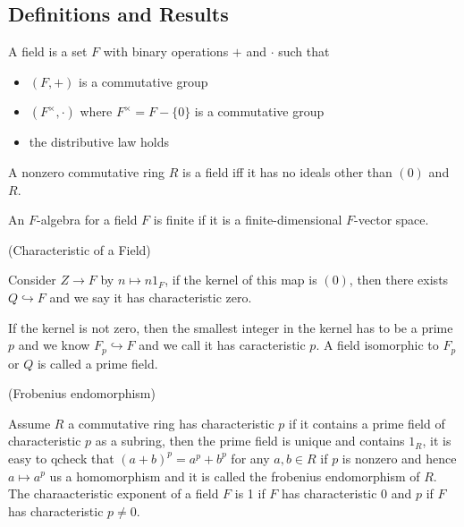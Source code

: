 \documentclass{article}
\begin{document}
\subsection{Definitions and Results}

\begin{definition}
    A field is a set $F$ with binary operations $+$ and $\cdot$ such that
    \begin{itemize}
        \item $(F,+)$ is a commutative group
        \item $(F^{\times},\cdot)$ where $F^{\times} = F - \{0\}$ is a commutative group
        \item the distributive law holds
    \end{itemize}
\end{definition}

\begin{lemma}
    A nonzero commutative ring $R$ is a field iff it has no ideals other than $(0)$ and $R$.
\end{lemma}

\begin{definition}
    An $F$-algebra for a field $F$ is finite if it is a finite-dimensional $F$-vector space.
\end{definition}

\begin{definition}
    (Characteristic of a Field)\par
    Consider $Z\to F$ by $n\mapsto n 1_F$, if the kernel of this map is $(0)$, then there exists $Q\hookrightarrow F$ and we say it has characteristic zero.\par
    If the kernel is not zero, then the smallest integer in the kernel has to be a prime $p$ and we know $F_p\hookrightarrow F$ and we call it has caracteristic $p$. A field isomorphic to $F_p$ or $Q$ is called a prime field.
\end{definition}

\begin{definition}
    (Frobenius endomorphism)\par
    Assume $R$ a commutative ring has characteristic $p$ if it contains a prime field of characteristic $p$ as a subring, then the prime field is unique and contains $1_R$, it is easy to qcheck that $(a+b)^p = a^p + b^p$ for any $a,b\in R$ if $p$ is nonzero and hence $a\mapsto a^p$ us a homomorphism and it is called the frobenius endomorphism of $R$. The charaacteristic exponent of a field $F$ is 1 if $F$ has characteristic $0$ and $p$ if $F$ has characteristic $p\neq 0$.
\end{definition}
\end{document}
